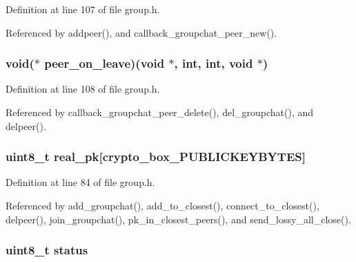 Definition at line 107 of file group.\+h.



Referenced by addpeer(), and callback\+\_\+groupchat\+\_\+peer\+\_\+new().

\hypertarget{struct_group__c_a7a79b984292a5ea1f68aca7b73067370}{
\subsubsection[{peer\+\_\+on\+\_\+leave}]{\setlength{\rightskip}{0pt plus 5cm}void($\ast$ peer\+\_\+on\+\_\+leave)(void $\ast$, int, int, void $\ast$)}}\label{struct_group__c_a7a79b984292a5ea1f68aca7b73067370}


Definition at line 108 of file group.\+h.



Referenced by callback\+\_\+groupchat\+\_\+peer\+\_\+delete(), del\+\_\+groupchat(), and delpeer().

\hypertarget{struct_group__c_ab42b4c90d81ac99b968c3edd1e21d706}{
\subsubsection[{real\+\_\+pk}]{\setlength{\rightskip}{0pt plus 5cm}uint8\+\_\+t real\+\_\+pk\mbox{[}crypto\+\_\+box\+\_\+\+P\+U\+B\+L\+I\+C\+K\+E\+Y\+B\+Y\+T\+E\+S\mbox{]}}}\label{struct_group__c_ab42b4c90d81ac99b968c3edd1e21d706}


Definition at line 84 of file group.\+h.



Referenced by add\+\_\+groupchat(), add\+\_\+to\+\_\+closest(), connect\+\_\+to\+\_\+closest(), delpeer(), join\+\_\+groupchat(), pk\+\_\+in\+\_\+closest\+\_\+peers(), and send\+\_\+lossy\+\_\+all\+\_\+close().

\hypertarget{struct_group__c_ade818037fd6c985038ff29656089758d}{
\subsubsection[{status}]{\setlength{\rightskip}{0pt plus 5cm}uint8\+\_\+t status}}\label{struct_group__c_ade818037fd6c985038ff29656089758d}


